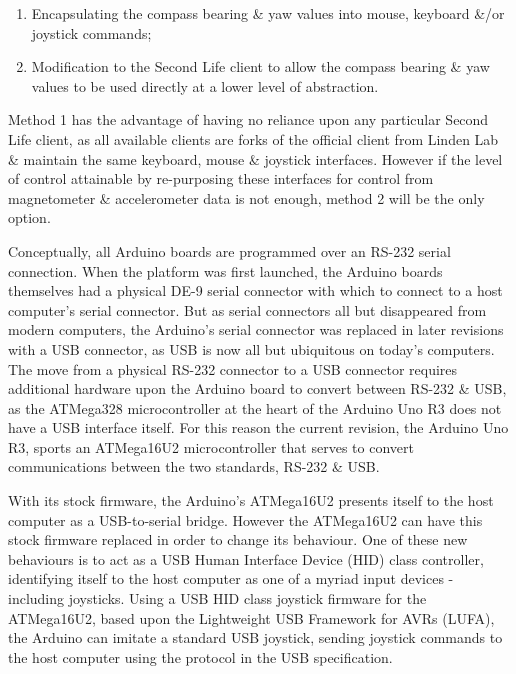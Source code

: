 \begin{enumerate}
	\item Encapsulating the compass bearing \& yaw values into mouse, keyboard \&/or joystick commands;
	\item Modification to the Second Life client to allow the compass bearing \& yaw values to be used directly at a lower level of abstraction.
\end{enumerate}

Method 1 has the advantage of having no reliance upon any particular Second Life client, as all available clients are forks of the official client from Linden Lab \& maintain the same keyboard, mouse \& joystick interfaces. However if the level of control attainable by re-purposing these interfaces for control from magnetometer \& accelerometer data is not enough, method 2 will be the only option.

Conceptually, all Arduino boards are programmed over an RS-232 serial connection. When the platform was first launched, the Arduino boards themselves had a physical DE-9 serial connector with which to connect to a host computer's serial connector. But as serial connectors all but disappeared from modern computers, the Arduino's serial connector was replaced in later revisions with a USB connector, as USB is now all but ubiquitous on today's computers. The move from a physical RS-232 connector to a USB connector requires additional hardware upon the Arduino board to convert between RS-232 \& USB, as the ATMega328\atmegaTFootnote{} microcontroller at the heart of the Arduino Uno R3 does not have a USB interface itself. For this reason the current revision, the Arduino Uno R3, sports an ATMega16U2\atmegaFootnote{} microcontroller that serves to convert communications between the two standards, RS-232 \& USB.

With its stock firmware, the Arduino's ATMega16U2 presents itself to the host computer as a USB-to-serial bridge. However the ATMega16U2 can have this stock firmware replaced in order to change its behaviour. One of these new behaviours is to act as a USB Human Interface Device (HID) class controller, identifying itself to the host computer as one of a myriad input devices - including joysticks. Using a USB HID class joystick firmware for the ATMega16U2\arduinousbhidFootnote{}, based upon the Lightweight USB Framework for AVRs (LUFA)\lufaFootnote{}, the Arduino can imitate a standard USB joystick, sending joystick commands to the host computer using the protocol in the USB specification.

